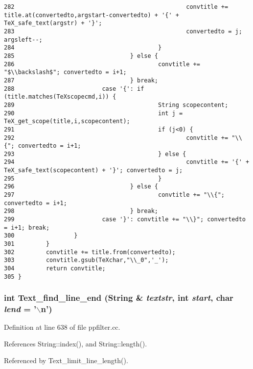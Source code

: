 \begin{verbatim}
282                                                 convtitle += title.at(convertedto,argstart-convertedto) + '{' + TeX_safe_text(argstr) + '}';
283                                                 convertedto = j; argsleft--;
284                                         }
285                                 } else {
286                                         convtitle += "$\\backslash$"; convertedto = i+1;
287                                 } break;
288                         case '{': if (title.matches(TeXscopecmd,i)) {
289                                         String scopecontent;
290                                         int j = TeX_get_scope(title,i,scopecontent);
291                                         if (j<0) {
292                                                 convtitle += "\\{"; convertedto = i+1;
293                                         } else {
294                                                 convtitle += '{' + TeX_safe_text(scopecontent) + '}'; convertedto = j;
295                                         }
296                                 } else {
297                                         convtitle += "\\{"; convertedto = i+1;
298                                 } break;
299                         case '}': convtitle += "\\}"; convertedto = i+1; break;
300                 }
301         }
302         convtitle += title.from(convertedto);
303         convtitle.gsub(TeXchar,"\\_0",'_');
304         return convtitle;
305 }
\end{verbatim}\normalsize 
{}
\subsubsection{\setlength{\rightskip}{0pt plus 5cm}int Text\_\-find\_\-line\_\-end ({\bf String} \& {\em textstr}, int {\em start}, char {\em lend} = '$\backslash$n')}\label{ppfilter_8cc_a15}




Definition at line 638 of file ppfilter.cc.

References String::index(), and String::length().

Referenced by Text\_\-limit\_\-line\_\-length().



